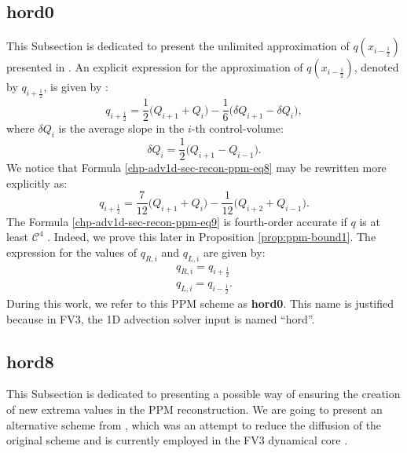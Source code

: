 \subsection{hord0}
\label{chp-adv1d-sec-hord0}
This Subsection is dedicated to present the unlimited approximation of $q(x_{i-\frac{1}{2}})$ presented in \citet{colella:1984}.
An explicit expression for the approximation of $q(x_{i-\frac{1}{2}})$, denoted by $q_{i+\frac{1}{2}}$, is given by \citep{colella:1984}:
\begin{equation}
	\label{chp-adv1d-sec-recon-ppm-eq7}
	q_{i+\frac{1}{2}} = \frac{1}{2} \bigg( Q_{i+1} + Q_{i} \bigg) - \frac{1}{6} \bigg( \delta Q_{i+1} - \delta Q_{i}\bigg),
\end{equation}
where $\delta Q_{i}$ is the average slope in the $i$-th control-volume:
\begin{equation}
	\label{chp-adv1d-sec-recon-ppm-eq8}
	\delta Q_{i} = \frac{1}{2} \bigg( Q_{i+1} - Q_{i-1} \bigg).
\end{equation}
We notice that Formula \eqref{chp-adv1d-sec-recon-ppm-eq8} may be rewritten more explicitly as:
\begin{equation}
	\label{chp-adv1d-sec-recon-ppm-eq9}
	q_{i+\frac{1}{2}} = \frac{7}{12} \bigg( Q_{i+1} + Q_{i} \bigg) - \frac{1}{12} \bigg(  Q_{i+2} +Q_{i-1}\bigg).
\end{equation}
The Formula \eqref{chp-adv1d-sec-recon-ppm-eq9} is fourth-order accurate if
$q$ is at least $\mathcal{C}^4$ \citep{colella:1984}. Indeed, we
prove this later in Proposition \ref{prop:ppm-bound1}.
The expression for the values of $q_{R,i}$ and $q_{L,i}$ are given by:
\begin{align}
	\label{chp-adv1d-sec-recon-ppm-eq10}
	q_{R,i} = q_{i+\frac{1}{2}} \\
	\label{chp-adv1d-sec-recon-ppm-eq11}
	q_{L,i} = q_{i-\frac{1}{2}}.
\end{align}
During this work, we refer to this PPM scheme as \textbf{hord0}.
This name is justified because in FV3, the 1D advection solver input is named ``hord''.

\subsection{hord8}
\label{chp-adv1d-sec-hord8}
This Subsection is dedicated to presenting a possible way of ensuring the creation of new 
extrema values in the PPM reconstruction. We are going to present an alternative scheme from \citet{lin:2004},
which was an attempt to reduce the diffusion of the original scheme \citet{colella:1984}
and is currently employed in the FV3 dynamical core \citep{harris:2021}.

